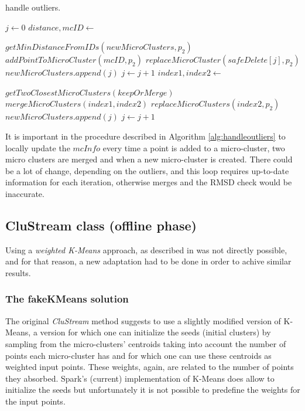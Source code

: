 \begin{algorithm}[h]
 \caption{handle outliers.}\label{alg:handleoutliers}
 \begin{algorithmic}[1]

  \vspace{10pt}
  \State $ j \gets 0$
  \State $distance,mcID \gets $
  \item[] $getMinDistanceFromIDs(newMicroClusters,p_2)$
  \State $addPointToMicroCluster(mcID,p_2)$
  \Else {}
  \State $replaceMicroCluster(safeDelete[j],p_2)$
  \State $newMicroClusters.append(j)$
  \State $j \gets j + 1$
  \Else
  \State $index1,index2 \gets $
  \item[] $getTwoClosestMicroClusters(keepOrMerge)$
  \State $mergeMicroClusters(index1,index2)$
  \State $replaceMicroClusters(index2,p_2)$
  \State $newMicroClusters.append(j)$
  \State $j \gets j + 1$
  \EndIf
  \EndIf
  \EndFor
 \end{algorithmic}
\end{algorithm}

It is important in the procedure described in Algorithm \ref{alg:handleoutliers} to locally update the $mcInfo$ every time a point is added to a micro-cluster, two micro clusters are merged and when a new micro-cluster is created. There could be a lot of change, depending on the outliers, and this loop requires up-to-date information for each iteration, otherwise merges and the RMSD check would be inaccurate.


\subsection{CluStream class (offline phase)}

Using a \textit{weighted K-Means} approach, as described in \cite{clustreamOrig} was not directly possible, and for that reason, a new adaptation had to be done in order to achive similar results.


\subsubsection{The fakeKMeans solution}

The original \textit{CluStream} method suggests to use a slightly modified version of K-Means, a version for which one can initialize the seeds (initial clusters) by sampling from the micro-clusters' centroids taking into account the number of points each micro-cluster has and for which one can use these centroids as weighted input points. These weights, again, are related to the number of points they absorbed. Spark's (current) implementation of K-Means does allow to initialize the seeds but unfortunately it is not possible to predefine the weights for the input points.


